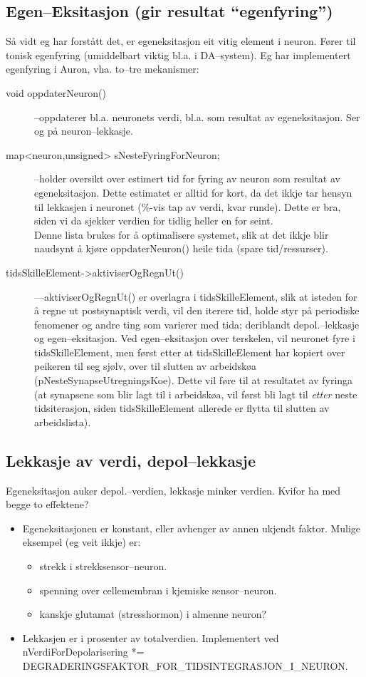 \subsection{Egen--Eksitasjon (gir resultat ``egenfyring'')}
Så vidt eg har forstått det, er egeneksitasjon eit vitig element i neuron. Fører til tonisk egenfyring (umiddelbart viktig bl.a. i DA--system).
Eg har implementert egenfyring i Auron, vha. to--tre mekanismer:
\begin{description}
	\item[void oppdaterNeuron()] --oppdaterer bl.a. neuronets verdi, bl.a. som resultat av egeneksitasjon. Ser og på neuron--lekkasje.
	\item[map<neuron,unsigned> sNesteFyringForNeuron;] --holder oversikt over estimert tid for fyring av neuron som resultat av egeneksitasjon. Dette estimatet er alltid for kort, da det ikkje tar hensyn til lekkasjen i neuronet (\%-vis tap av verdi, kvar runde). Dette er bra, siden vi da sjekker verdien for tidlig heller en for seint.\\
Denne lista brukes for å optimalisere systemet, slik at det ikkje blir naudsynt å kjøre oppdaterNeuron() heile tida (spare tid/ressurser).
	\item[tidsSkilleElement->aktiviserOgRegnUt()] ---aktiviserOgRegnUt() er overlagra i tidsSkilleElement, slik at isteden for å regne ut postsynaptisk verdi, vil den iterere tid, holde styr på periodiske fenomener og andre ting som varierer med tida; deriblandt depol.--lekkasje og egen--eksitasjon. Ved egen--eksitasjon over terskelen, vil neuronet fyre i tidsSkilleElement, men først etter at tidsSkilleElement har kopiert over peikeren til seg sjølv, over til slutten av arbeidskøa (pNesteSynapseUtregningsKoe). Dette vil føre til at resultatet av fyringa (at synapsene som blir lagt til i arbeidskøa, vil først bli lagt til \emph{etter} neste tidsiterasjon, siden tidsSkilleElement allerede er flytta til slutten av arbeidslista).
\end{description}

\subsection{Lekkasje av verdi, depol--lekkasje}
Egeneksitasjon auker depol.--verdien, lekkasje minker verdien. Kvifor ha med begge to effektene?
\begin{itemize}
	\item Egeneksitasjonen er konstant, eller avhenger av annen ukjendt faktor. Mulige eksempel (eg veit ikkje) er:
	\begin{itemize}
		\item strekk i strekksensor--neuron.
		\item spenning over cellemembran i kjemiske sensor--neuron.
		\item kanskje glutamat (stresshormon) i almenne neuron?
	\end{itemize}
	\item Lekkasjen er i prosenter av totalverdien. Implementert ved \\nVerdiForDepolarisering *= \mbox{DEGRADERINGSFAKTOR\_FOR\_TIDSINTEGRASJON\_I\_NEURON}.
\end{itemize}

